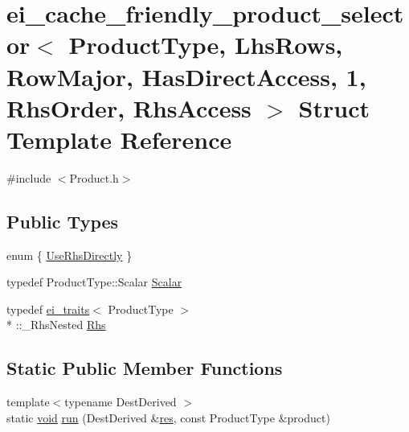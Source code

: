 \hypertarget{structei__cache__friendly__product__selector_3_01_product_type_00_01_lhs_rows_00_01_row_major_0004e85d331a9d3202615416911b3c7cf8}{\section{ei\-\_\-cache\-\_\-friendly\-\_\-product\-\_\-selector$<$ Product\-Type, Lhs\-Rows, Row\-Major, Has\-Direct\-Access, 1, Rhs\-Order, Rhs\-Access $>$ Struct Template Reference}
\label{structei__cache__friendly__product__selector_3_01_product_type_00_01_lhs_rows_00_01_row_major_0004e85d331a9d3202615416911b3c7cf8}
}


{\ttfamily \#include $<$Product.\-h$>$}

\subsection*{Public Types}
\begin{DoxyCompactItemize}
\item 
enum \{ \hyperlink{structei__cache__friendly__product__selector_3_01_product_type_00_01_lhs_rows_00_01_row_major_0004e85d331a9d3202615416911b3c7cf8_adf5c56407d0d8a1d442ea20a7096ebc9ac76572da461d66aab38d62b20893ff84}{Use\-Rhs\-Directly}
 \}
\item 
typedef Product\-Type\-::\-Scalar \hyperlink{structei__cache__friendly__product__selector_3_01_product_type_00_01_lhs_rows_00_01_row_major_0004e85d331a9d3202615416911b3c7cf8_a7aabd52ad58b190245811558433cda0e}{Scalar}
\item 
typedef \hyperlink{structei__traits}{ei\-\_\-traits}$<$ Product\-Type $>$\\*
\-::\-\_\-\-Rhs\-Nested \hyperlink{structei__cache__friendly__product__selector_3_01_product_type_00_01_lhs_rows_00_01_row_major_0004e85d331a9d3202615416911b3c7cf8_a6b44cb0f3bb9987c7052a35bf9fd50b2}{Rhs}
\end{DoxyCompactItemize}
\subsection*{Static Public Member Functions}
\begin{DoxyCompactItemize}
\item 
{\footnotesize template$<$typename Dest\-Derived $>$ }\\static \hyperlink{group___u_a_v_objects_plugin_ga444cf2ff3f0ecbe028adce838d373f5c}{void} \hyperlink{structei__cache__friendly__product__selector_3_01_product_type_00_01_lhs_rows_00_01_row_major_0004e85d331a9d3202615416911b3c7cf8_a0595a7eed577d0843328ae23fa45a2e8}{run} (Dest\-Derived \&\hyperlink{glext_8h_a1dbb21208b9047cc8031ca9c840d3c2f}{res}, const Product\-Type \&product)
\end{DoxyCompactItemize}


